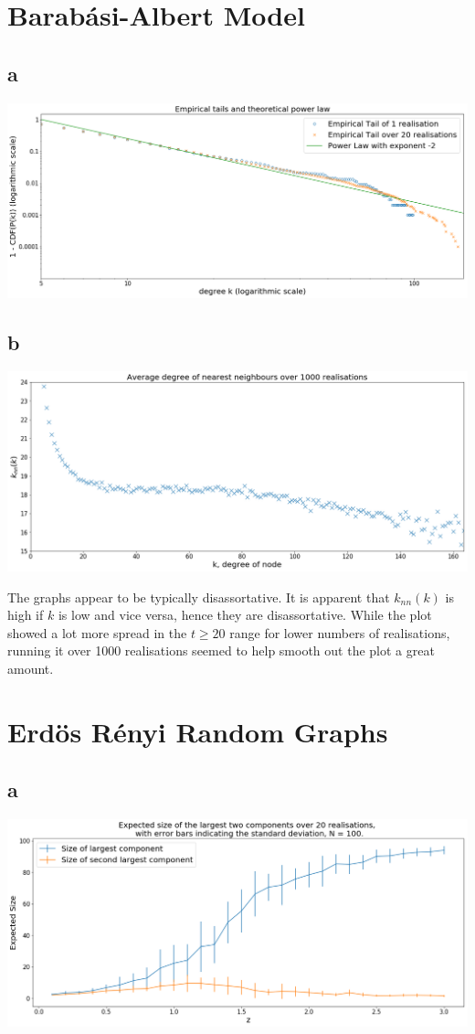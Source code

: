 \documentclass[12pt, twoside, a4paper]{article}
\begin{document}
\section{Barab\'asi-Albert Model}

\subsection*{a}
\includegraphics[width = 170mm]{tail}

\subsection*{b}
\includegraphics[width = 170mm]{knn}

The graphs appear to be typically disassortative. It is apparent that $k_{nn}(k)$ is high if $k$ is low and vice versa, hence they are disassortative. While the plot showed a lot more spread in the $t \geq 20$ range for lower numbers of realisations, running it over 1000 realisations seemed to help smooth out the plot a great amount. 

\section{Erd\"os R\'enyi Random Graphs}

\subsection*{a}
\includegraphics[width = 170mm]{lc100}
\end{document}
